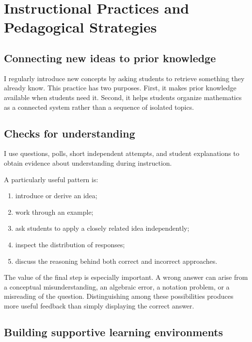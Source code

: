 \documentclass[11pt]{article}
\begin{document}
\section{Instructional Practices and Pedagogical Strategies}

\subsection{Connecting new ideas to prior knowledge}

I regularly introduce new concepts by asking students to
retrieve something they already know.
 This practice has two purposes. First,
it makes prior knowledge available when students need it.
Second,
it helps students organize mathematics as a connected system
rather than a sequence of isolated topics.

\subsection{Checks for understanding}

I use questions,
polls,
short independent attempts,
and student explanations to obtain evidence about
understanding during instruction.

A particularly useful pattern is:

\begin{enumerate}
    \item introduce or derive an idea;
    \item work through an example;
    \item ask students to apply a closely related idea
    independently;
    \item inspect the distribution of responses;
    \item discuss the reasoning behind both correct and
    incorrect approaches.
\end{enumerate}

The value of the final step is especially important.
A wrong answer can arise from a conceptual misunderstanding,
an algebraic error,
a notation problem,
or a misreading of the question.
Distinguishing among these possibilities produces more useful
feedback than simply displaying the correct answer.

\subsection{Building supportive learning environments}
\end{document}
